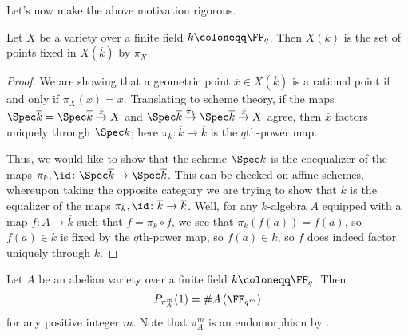 \documentclass{amsart}
\begin{document}
Let's now make the above motivation rigorous.
\begin{lemma} \label{lem:get-fq-points-from-frob}
	Let $X$ be a variety over a finite field $k\coloneqq\FF_q$. Then $X(k)$ is the set of points fixed in $X(\overline k)$ by $\pi_X$.
\end{lemma}
\begin{proof}
	We are showing that a geometric point $\overline x\in X(\overline k)$ is a rational point if and only if $\pi_X(\overline x)=\overline x$. Translating to scheme theory, if the maps $\Spec\overline k=\Spec\overline k\stackrel{\overline x}\to X$ and $\Spec\overline k\stackrel{\pi_{k}}\to\Spec\overline k\stackrel{\overline x}\to X$ agree, then $\overline x$ factors uniquely through $\Spec k$; here $\pi_k\colon\overline k\to\overline k$ is the $q$th-power map.

	Thus, we would like to show that the scheme $\Spec k$ is the coequalizer of the maps $\pi_k,{\id}\colon\Spec\overline k\to\Spec\overline k$. This can be checked on affine schemes, whereupon taking the opposite category we are trying to show that $k$ is the equalizer of the maps $\pi_k,{\id}\colon\overline k\to\overline k$. Well, for any $k$-algebra $A$ equipped with a map $f\colon A\to\overline k$ such that $f=\pi_k\circ f$, we see that $\pi_k(f(a))=f(a)$, so $f(a)\in\overline k$ is fixed by the $q$th-power map, so $f(a)\in k$, so $f$ does indeed factor uniquely through $k$.
\end{proof}
\begin{proposition} \label{prop:frob-counts-points}
	Let $A$ be an abelian variety over a finite field $k\coloneqq\FF_q$. Then
	\[P_{\pi_A^m}(1)=\#A\left(\FF_{q^m}\right)\]
	for any positive integer $m$. Note that $\pi_A^m$ is an endomorphism by .
\end{proposition}
\end{document}

